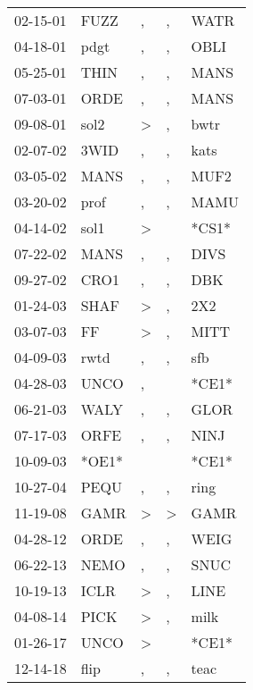 \begin{supertabular}{lllll}
 02-15-01 &   FUZZ &             , &             , &   WATR \\
 04-18-01 &   pdgt &             , &             , &   OBLI \\
 05-25-01 &   THIN &             , &             , &   MANS \\
 07-03-01 &   ORDE &             , &             , &   MANS \\
 09-08-01 &   sol2 &  \textgreater &             , &   bwtr \\
 02-07-02 &   3WID &             , &             , &   kats \\
 03-05-02 &   MANS &             , &             , &   MUF2 \\
 03-20-02 &   prof &             , &             , &   MAMU \\
 04-14-02 &   sol1 &  \textgreater &               &  *CS1* \\
 07-22-02 &   MANS &             , &             , &   DIVS \\
 09-27-02 &   CRO1 &             , &             , &    DBK \\
 01-24-03 &   SHAF &  \textgreater &             , &    2X2 \\
 03-07-03 &     FF &  \textgreater &             , &   MITT \\
 04-09-03 &   rwtd &             , &             , &    sfb \\
 04-28-03 &   UNCO &             , &               &  *CE1* \\
 06-21-03 &   WALY &             , &             , &   GLOR \\
 07-17-03 &   ORFE &             , &             , &   NINJ \\
 10-09-03 &  *OE1* &               &               &  *CE1* \\
 10-27-04 &   PEQU &             , &             , &   ring \\
 11-19-08 &   GAMR &  \textgreater &  \textgreater &   GAMR \\
 04-28-12 &   ORDE &             , &             , &   WEIG \\
 06-22-13 &   NEMO &             , &             , &   SNUC \\
 10-19-13 &   ICLR &  \textgreater &             , &   LINE \\
 04-08-14 &   PICK &  \textgreater &             , &   milk \\
 01-26-17 &   UNCO &  \textgreater &               &  *CE1* \\
 12-14-18 &   flip &             , &             , &   teac \\
\end{supertabular}

